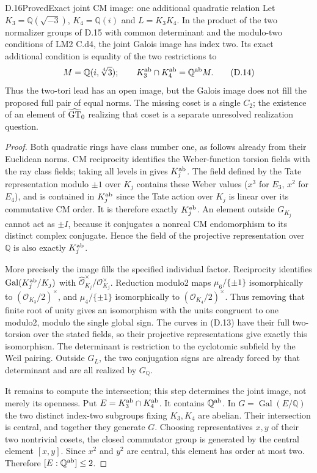 \begin{statement}{D.16}{Proved}{Exact joint CM image: one additional quadratic relation}
Let $K_3=\mathbb Q(\sqrt{-3})$, $K_4=\mathbb Q(i)$ and $L=K_3K_4$. In the product of the two normalizer groups of D.15 with common determinant and the modulo-two conditions of LM2 C.d4, the joint Galois image has index two. Its exact additional condition is equality of the two restrictions to
\[
 M=\mathbb Q(i,\sqrt[4]{3});\qquad
 K_3^{\rm ab}\cap K_4^{\rm ab}=\mathbb Q^{\rm ab}M.         \tag{D.14}
\]
Thus the two-tori lead has an open image, but the Galois image does not fill the proposed full pair of equal norms. The missing coset is a single $C_2$; the existence of an element of $\widehat{\rm GT}_0$ realizing that coset is a separate unresolved realization question.
\end{statement}
\begin{proof}
Both quadratic rings have class number one, as follows already from their Euclidean norms. CM reciprocity identifies the Weber-function torsion fields with the ray class fields; taking all levels in \cite[Corollary3.4]{dLozano2022} gives $K_j^{\rm ab}$. The field defined by the Tate representation modulo $\pm1$ over $K_j$ contains these Weber values ($x^3$ for $E_3$, $x^2$ for $E_4$), and is contained in $K_j^{\rm ab}$ since the Tate action over $K_j$ is linear over its commutative CM order. It is therefore exactly $K_j^{\rm ab}$. An element outside $G_{K_j}$ cannot act as $\pm I$, because it conjugates a nonreal CM endomorphism to its distinct complex conjugate. Hence the field of the projective representation over $\mathbb Q$ is also exactly $K_j^{\rm ab}$.

More precisely the image fills the specified individual factor. Reciprocity identifies $\operatorname{Gal}(K_j^{\rm ab}/K_j)$ with $\widehat{\mathcal O}_{K_j}^{\times}/\mathcal O_{K_j}^{\times}$. Reduction modulo2 maps $\mu_6/\{\pm1\}$ isomorphically to $(\mathcal O_{K_3}/2)^\times$, and $\mu_4/\{\pm1\}$ isomorphically to $(\mathcal O_{K_4}/2)^\times$. Thus removing that finite root of unity gives an isomorphism with the units congruent to one modulo2, modulo the single global sign. The curves in (D.13) have their full two-torsion over the stated fields, so their projective representations give exactly this isomorphism. The determinant is restriction to the cyclotomic subfield by the Weil pairing. Outside $G_L$, the two conjugation signs are already forced by that determinant and are all realized by $G_{\mathbb Q}$.

It remains to compute the intersection; this step determines the joint image, not merely its openness. Put $E=K_3^{\rm ab}\cap K_4^{\rm ab}$. It contains $\mathbb Q^{\rm ab}$. In $G=\operatorname{Gal}(E/\mathbb Q)$ the two distinct index-two subgroups fixing $K_3,K_4$ are abelian. Their intersection is central, and together they generate $G$. Choosing representatives $x,y$ of their two nontrivial cosets, the closed commutator group is generated by the central element $[x,y]$. Since $x^2$ and $y^2$ are central, this element has order at most two. Therefore $[E:\mathbb Q^{\rm ab}]\leq2$.


\end{proof}
